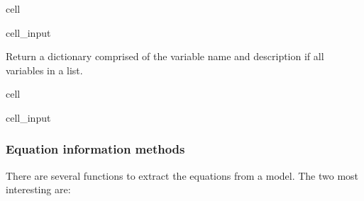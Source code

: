 \documentclass[letterpaper,10pt,english]{jupyterBook}
\begin{document}
\begin{sphinxuseclass}{cell}\begin{sphinxVerbatimInput}

\begin{sphinxuseclass}{cell_input}
\begin{sphinxVerbatim}[commandchars=\\\{\}]
\end{sphinxVerbatim}

\end{sphinxuseclass}\end{sphinxVerbatimInput}

\end{sphinxuseclass}
\sphinxAtStartPar
Return a dictionary comprised of the variable name and description if all variables in a list.

\begin{sphinxuseclass}{cell}\begin{sphinxVerbatimInput}

\begin{sphinxuseclass}{cell_input}
\begin{sphinxVerbatim}[commandchars=\\\{\}]
\end{sphinxVerbatim}

\end{sphinxuseclass}\end{sphinxVerbatimInput}

\end{sphinxuseclass}

\subsubsection{Equation information methods}
\label{\detokenize{content/06_WBModels/LoadingWBModel:equation-information-methods}}
\sphinxAtStartPar
There are several functions to extract the equations from a model.  The two most interesting are:
\end{document}
